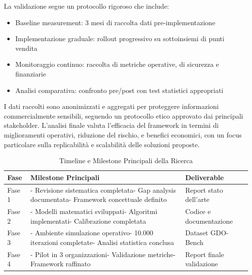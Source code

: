 La validazione segue un protocollo rigoroso che include:
\begin{itemize}
    \item Baseline measurement: 3 mesi di raccolta dati pre-implementazione
    \item Implementazione graduale: rollout progressivo su sottoinsiemi di punti vendita
    \item Monitoraggio continuo: raccolta di metriche operative, di sicurezza e finanziarie
    \item Analisi comparativa: confronto pre/post con test statistici appropriati

\end{itemize}
I dati raccolti sono anonimizzati e aggregati per proteggere informazioni commercialmente sensibili, seguendo un protocollo etico approvato dai principali stakeholder. L'analisi finale valuta l'efficacia del framework in termini di miglioramenti operativi, riduzione del rischio, e benefici economici, con un focus particolare sulla replicabilità e scalabilità delle soluzioni proposte.

\begin{table}[htbp]
\centering
\caption{Timeline e Milestone Principali della Ricerca}
\label{tab:timeline_ricerca}
\begin{tabular}{|l|p{6cm}|l|}
\hline
\textbf{Fase} & \textbf{Milestone Principali} & \textbf{Deliverable} \\
\hline
Fase 1 &  - Revisione sistematica completata\newline- Gap analysis documentata\newline- Framework concettuale definito & Report stato dell'arte \\
\hline
Fase 2 & - Modelli matematici sviluppati\newline- Algoritmi implementati\newline- Calibrazione completata & Codice e documentazione \\
\hline
Fase 3 & - Ambiente simulazione operativo\newline- 10.000 iterazioni completate\newline- Analisi statistica conclusa & Dataset GDO-Bench \\
\hline
Fase 4 & - Pilot in 3 organizzazioni\newline- Validazione metriche\newline- Framework raffinato & Report finale validazione \\
\hline
\end{tabular}
\end{table}

